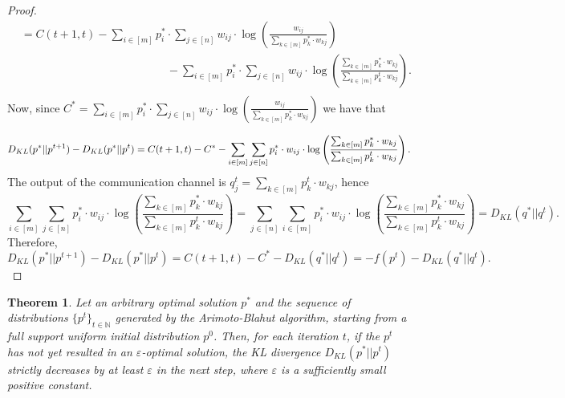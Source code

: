\documentclass[11pt, letterpaper]{article}
\newtheorem{theorem}{Theorem}
\begin{document}
\begin{proof}
\begin{equation*}
\begin{split}
    & = C(t+1,t) - \sum_{i \in [m]} p^*_i \cdot  \sum_{j \in [n]} w_{ij} \cdot  \log\left(\frac{w_{ij}}{\sum_{k \in [m]} p^*_k \cdot w_{kj}}\right) \\
    & \hspace{13em} - \sum_{i \in [m]} p^*_i \cdot  \sum_{j \in [n]} w_{ij} \cdot  \log\left(\frac{ \sum_{k \in [m]} p^*_k \cdot w_{kj}}{\sum_{k \in [m]} p^t_k \cdot w_{kj}}\right).\\
\end{split}
\end{equation*} Now, since $C^* = \sum_{i \in [m]} p^*_i \cdot  \sum_{j \in [n]} w_{ij} \cdot  \log\left(\frac{w_{ij}}{\sum_{k \in [m]} p^*_k \cdot w_{kj}}\right)$ we have that

\begin{equation*}
    D_{KL} (p^*||p^{t+1}) - D_{KL}(p^*||p^{t})  = C(t+1,t) - C^* - \sum_{i \in [m]}  \sum_{j \in [n]} p^*_i \cdot  w_{ij} \cdot  \log \left(\frac{\sum_{k \in [m]} p^*_k \cdot w_{kj}}{\sum_{k \in [m]} p^t_k \cdot w_{kj}} \right).\\
\end{equation*}
The output of the communication channel is $q^t_j = \sum_{k \in [m]} p^t_k \cdot w_{kj}$, hence
\begin{equation*}
    \sum_{i \in [m]}  \sum_{j \in [n]} p^*_i \cdot  w_{ij} \cdot  \log \left(\frac{\sum_{k \in [m]} p^*_k \cdot w_{kj}}{\sum_{k \in [m]} p^t_k \cdot w_{kj}} \right) = \sum_{j \in [n]}  \sum_{i \in [m]} p^*_i \cdot  w_{ij} \cdot  \log \left(\frac{\sum_{k \in [m]} p^*_k \cdot w_{kj}}{\sum_{k \in [m]} p^t_k \cdot w_{kj}} \right) = D_{KL}(q^*||q^t).
\end{equation*}
Therefore,
\begin{equation*}
    D_{KL}(p^*||p^{t+1}) - D_{KL}(p^*||p^{t}) = C(t+1,t) - C^* - D_{KL}(q^*||q^t)  = - f(p^t)- D_{KL}(q^*||q^t).
\end{equation*}
\end{proof}

\begin{theorem}
\label{Difference of KL}
Let an arbitrary optimal solution $p^*$ and the sequence of distributions $\{p^t\}_{t \in \mathbb{N}}$ generated by the Arimoto-Blahut algorithm, starting from a full support uniform initial distribution $p^0$. Then, for each iteration $t$, if the $p^{t}$ has not yet resulted in an $\varepsilon$-optimal solution, the KL divergence $D_{KL}(p^*||p^{t})$ strictly decreases by at least $\varepsilon$ in the next step, where $\varepsilon$ is a sufficiently small positive constant.
\end{theorem}
\end{document}
